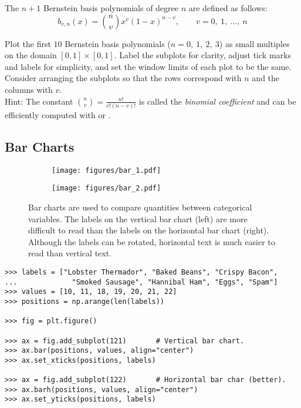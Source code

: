 
\begin{problem} %
The $n+1$ Bernstein basis polynomials of degree $n$ are defined as follows:
\[b_{v,n}(x) = {{n} \choose {v}} x^v (1-x)^{n-v},\qquad v = 0,\ 1,\ \ldots,\ n\]

Plot the first $10$ Bernstein basis polynomials ($n = 0,\ 1,\ 2,\ 3$) as small multiples on the domain $[0,1] \times [0,1]$.
Label the subplots for clarity, adjust tick marks and labels for simplicity, and set the window limits of each plot to be the same.
Consider arranging the subplots so that the rows correspond with $n$ and the columns with $v$.
\\Hint: The constant ${{n} \choose {v}} = \frac{n!}{v!(n-v)!}$ is called the \emph{binomial coefficient} and can be efficiently computed with  or .
\end{problem}

\subsection*{Bar Charts} %

\begin{figure}[H] %
    \centering
    \begin{subfigure}{.47\textwidth}
        \centering
        \texttt{[image: figures/bar\_1.pdf]}
    \end{subfigure}
    \begin{subfigure}{.52\textwidth}
        \centering
        \texttt{[image: figures/bar\_2.pdf]}
    \end{subfigure}
    \caption{Bar charts are used to compare quantities between categorical variables. The labels on the vertical bar chart (left) are more difficult to read than the  labels on the horizontal bar chart (right). Although the labels can be rotated, horizontal text is much easier to read than vertical text.}
\end{figure}

\begin{lstlisting}
>>> labels = ["Lobster Thermador", "Baked Beans", "Crispy Bacon",
...             "Smoked Sausage", "Hannibal Ham", "Eggs", "Spam"]
>>> values = [10, 11, 18, 19, 20, 21, 22]
>>> positions = np.arange(len(labels))

>>> fig = plt.figure()

>>> ax = fig.add_subplot(121)       # Vertical bar chart.
>>> ax.bar(positions, values, align="center")
>>> ax.set_xticks(positions, labels)

>>> ax = fig.add_subplot(122)       # Horizontal bar char (better).
>>> ax.barh(positions, values, align="center")
>>> ax.set_yticks(positions, labels)
\end{lstlisting}

